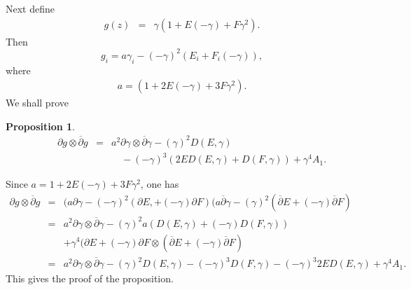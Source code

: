 \documentclass[12pt]{amsart}
\newtheorem{proposition}{Proposition}[section]
\def\proof{\noindent {\bf Proof. \ }}
\def\d{\partial}
\def\dbar{\overline{\partial}}
\def\d{\partial}
\begin{document}
Next define
\begin{eqnarray}
g(z)&=&\gamma(1+E (-\gamma)+F\gamma^2).
\end{eqnarray}
Then
\begin{equation}
g_i=a \gamma_i- (-\gamma)^2(E_i +F_i (-\gamma)),
\end{equation}
where
\begin{eqnarray}
a=(1+2E(-\gamma) +3F\gamma^2).
\end{eqnarray}
We shall prove
\begin{proposition} 
\begin{eqnarray}
\qquad \d g\otimes \dbar g
&=&a^2  \d \gamma \otimes \dbar \gamma -(\gamma)^2  D(E,\gamma)\nonumber\\
&&\quad  -(-\gamma)^3 ( 2E D(E, \gamma)+ D(F, \gamma) )+\gamma^4 A_1.
\end{eqnarray}
\end{proposition}
\proof  Since $a=1+2E(-\gamma)+3F\gamma^2$, one has
\begin{eqnarray*}
\d g \otimes \dbar g &=& (a \d \gamma -(-\gamma)^2(\d E, +(-\gamma) \d F) (a\dbar \gamma -(\gamma)^2 (\dbar E+(-\gamma) \dbar F)\\
&=&a^2  \d \gamma \otimes \dbar \gamma -(\gamma)^2 a (D(E, \gamma)+(-\gamma) D(F, \gamma))\\
&&+\gamma^4 (\d E+(-\gamma) \d F \otimes (\dbar E+(-\gamma)\dbar F)\\
&=&a^2 \d \gamma \otimes \dbar \gamma 
-(\gamma)^2  D(E,\gamma) -(-\gamma)^3 D(F, \gamma) -(-\gamma)^3 2E D(E, \gamma) +\gamma^4 A_1.
\end{eqnarray*}
This gives the proof of the proposition. 
\end{document}
